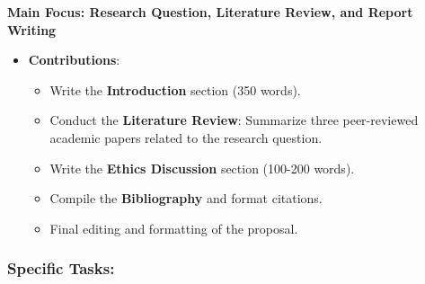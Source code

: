 \documentclass[
  letterpaper,
  DIV=11,
  numbers=noendperiod]{scrartcl}
\providecommand{\tightlist}{%
  \setlength{\itemsep}{0pt}\setlength{\parskip}{0pt}}\usepackage{longtable,booktabs,array}
\begin{document}
\textbf{Main Focus: Research Question, Literature Review, and Report
Writing}

\begin{itemize}
\tightlist
\item
  \textbf{Contributions}:

  \begin{itemize}
  \tightlist
  \item
    Write the \textbf{Introduction} section (350 words).
  \item
    Conduct the \textbf{Literature Review}: Summarize three
    peer-reviewed academic papers related to the research question.
  \item
    Write the \textbf{Ethics Discussion} section (100-200 words).
  \item
    Compile the \textbf{Bibliography} and format citations.
  \item
    Final editing and formatting of the proposal.
  \end{itemize}
\end{itemize}

\subsubsection{Specific Tasks:}\label{specific-tasks-1}
\end{document}

